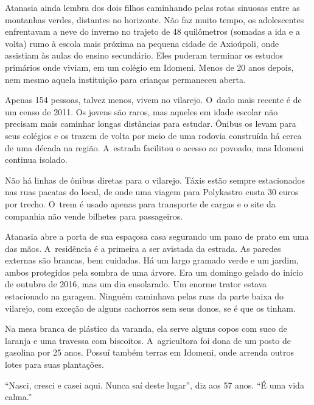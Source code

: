\putodd{}
\clearpage

 

Atanasia ainda lembra dos dois filhos caminhando pelas rotas sinuosas
entre as montanhas verdes, distantes no horizonte. Não faz muito
tempo, os adolescentes enfrentavam a neve do inverno no trajeto de
48 quilômetros (somadas a ida e a volta) rumo à escola mais próxima na
pequena cidade de Axioúpoli, onde assistiam às aulas do ensino
secundário. Eles puderam terminar os estudos primários onde viviam, em
um colégio em Idomeni. Menos de 20 anos depois, nem mesmo aquela
instituição para crianças permaneceu aberta.

Apenas 154 pessoas, talvez menos, vivem no vilarejo. O~dado mais recente
é de um censo de 2011. Os jovens são raros, mas aqueles em idade escolar
não precisam mais caminhar longas distâncias para estudar. Ônibus os
levam para seus colégios e os trazem de volta por meio de uma rodovia
construída há cerca de uma década na região. A~estrada facilitou o
acesso ao povoado, mas Idomeni continua isolado.

Não há linhas de ônibus diretas para o vilarejo. Táxis estão sempre
estacionados nas ruas pacatas do local, de onde uma viagem para
Polykastro custa 30 euros por trecho. O~trem é usado apenas para
transporte de cargas e o site da companhia não vende bilhetes para
passageiros.

Atanasia abre a porta de sua espaçosa casa segurando um pano de prato em
uma das mãos. A~residência é a primeira a ser avistada da estrada. As
paredes externas são brancas, bem cuidadas. Há um largo gramado verde e
um jardim, ambos protegidos pela sombra de uma árvore. Era um domingo
gelado do início de outubro de 2016, mas um dia ensolarado. Um enorme
trator estava estacionado na garagem. Ninguém caminhava pelas ruas da
parte baixa do vilarejo, com exceção de alguns cachorros sem seus
donos, se é que os tinham.

Na mesa branca de plástico da varanda, ela serve alguns copos com
suco de laranja e uma travessa com biscoitos. A~agricultora foi dona de
um posto de gasolina por 25 anos. Possuí também terras em Idomeni, onde
arrenda outros lotes para suas plantações.

``Nasci, cresci e casei aqui. Nunca saí deste lugar'', diz aos 57 anos.
``É uma vida calma.''

